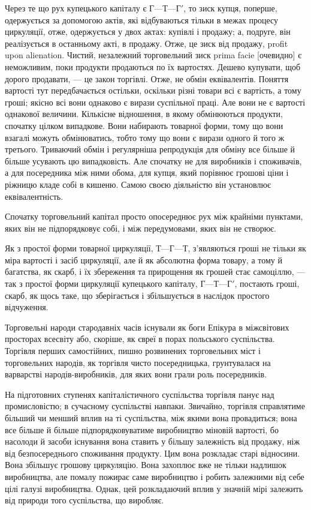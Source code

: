 
Через те що рух купецького капіталу є $Г — Т — Г'$, то зиск
купця, поперше, одержується за допомогою актів, які відбуваються
тільки в межах процесу циркуляції, отже, одержується
у двох актах: купівлі і продажу; а, подруге, він реалізується в
останньому акті, в продажу. Отже, це зиск від продажу, profit
upon alienation. Чистий, незалежний торговельний зиск prima
facie [очевидно] є неможливим, поки продукти продаються по їх
вартостях. Дешево купувати, щоб дорого продавати, — це закон
торгівлі. Отже, не обмін еквівалентів. Поняття вартості тут
передбачається остільки, оскільки різні товари всі є вартість,
а тому гроші; якісно всі вони однаково є вирази суспільної праці.
Але вони не є вартості однакової величини. Кількісне відношення,
в якому обмінюються продукти, спочатку цілком випадкове. Вони
набирають товарної форми, тому що вони взагалі можуть обмінюватись,
тобто тому що вони є вирази одного й того ж третього.
Триваючий обмін і регулярніша репродукція для обміну все більше
й більше усувають цю випадковість. Але спочатку не для виробників
і споживачів, а для посередника між ними обома, для
купця, який порівнює грошові ціни і ріжницю кладе собі в кишеню.
Самою своєю діяльністю він установлює еквівалентність.

Спочатку торговельний капітал просто опосереднює рух між
крайніми пунктами, яких він не підпорядковує собі, і між передумовами,
яких він не створює.

Як з простої форми товарної циркуляції, $Т — Г — Т$, з’являються
гроші не тільки як міра вартості і засіб циркуляції, але й як
абсолютна форма товару, а тому й багатства, як скарб, і їх збереження
та прирощення як грошей стає самоціллю, — так з простої
форми циркуляції купецького капіталу, $Г — Т — Г'$, постають
гроші, скарб, як щось таке, що зберігається і збільшується в наслідок
простого відчуження.

Торговельні народи стародавніх часів існували як боги Епікура
в міжсвітових просторах всесвіту або, скоріше, як євреї в
порах польського суспільства. Торгівля перших самостійних,
пишно розвинених торговельних міст і торговельних народів, як
торгівля чисто посередницька, грунтувалася на варварстві народів-виробників,
для яких вони грали роль посередників.

На підготовних ступенях капіталістичного суспільства торгівля
панує над промисловістю; в сучасному суспільстві навпаки. Звичайно,
торгівля справлятиме більший чи менший вплив на ті суспільства,
між якими вона провадиться; вона все більше й більше
підпорядковуватиме виробництво міновій вартості, бо насолоди
й засоби існування вона ставить у більшу залежність від продажу,
ніж від безпосереднього споживання продукту. Цим вона розкладає
старі відносини. Вона збільшує грошову циркуляцію. Вона захоплює
вже не тільки надлишок виробництва, але помалу пожирає
саме виробництво і робить залежними від себе цілі галузі
виробництва. Однак, цей розкладаючий вплив у значній мірі
залежить від природи того суспільства, що виробляє.
